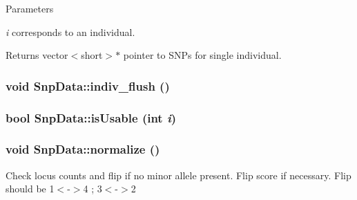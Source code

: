 \begin{DoxyParams}{Parameters}
\item[{\em i}]corresponds to an individual. \end{DoxyParams}
\begin{DoxyReturn}{Returns}
vector$<$short$>$$\ast$ pointer to SNPs for single individual. 
\end{DoxyReturn}
\hypertarget{classSnpData_ad2089f56539d02ab64282473b0ca9bd0}{
\subsubsection[{indiv\_\-flush}]{\setlength{\rightskip}{0pt plus 5cm}void SnpData::indiv\_\-flush ()}}
\label{classSnpData_ad2089f56539d02ab64282473b0ca9bd0}
\hypertarget{classSnpData_adcde7db42d75082f1ff23379c0a52caa}{
\subsubsection[{isUsable}]{\setlength{\rightskip}{0pt plus 5cm}bool SnpData::isUsable (int {\em i})}}
\label{classSnpData_adcde7db42d75082f1ff23379c0a52caa}
\hypertarget{classSnpData_ad7f9a7e9b8635ae55b970786ce791b7b}{
\subsubsection[{normalize}]{\setlength{\rightskip}{0pt plus 5cm}void SnpData::normalize ()}}
\label{classSnpData_ad7f9a7e9b8635ae55b970786ce791b7b}
Check locus counts and flip if no minor allele present. Flip score if necessary. Flip should be 1$<$-\/$>$4 ; 3$<$-\/$>$2


